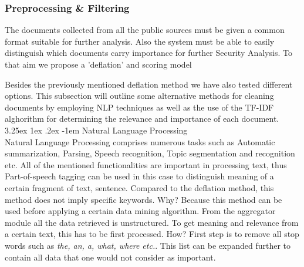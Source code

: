 \documentclass[12pt]{article}
\makeatletter
\newcounter{subsubsubsection}[subsubsection]
\renewcommand\paragraph{\@startsection{paragraph}{5}{\z@}%
  {3.25ex \@plus1ex \@minus.2ex}%
  {-1em}%
  {\normalfont\normalsize\bfseries}}
\makeatother
\begin{document}
\newpage
\subsubsection{Preprocessing \& Filtering}
The documents collected from all the public sources must be given a common format suitable for further analysis. Also the system must be able to easily distinguish which documents carry importance for further Security Analysis. To that aim we propose a 'deflation' and scoring model 


Besides the previously mentioned deflation method we have also tested different options. This subsection will outline some alternative methods for cleaning documents by employing NLP techniques as well as the use of the TF-IDF alghorithm for determining the relevance and importance of each document.
\paragraph{Natural Language Processing}
\hfill \break
\\
Natural Language Processing comprises numerous tasks such as Automatic summarization, Parsing, Speech recognition, Topic segmentation and recognition etc. All of the mentioned functionalities are important in processing text, thus 
Part-of-speech tagging can be used in this case to distinguish meaning of a certain fragment of text, sentence. Compared to the deflation method, this method does not imply specific keywords. Why? Because this method can be used before applying a certain data mining algorithm. From the aggregator module all the data retrieved is unstructured. To get meaning and relevance from a certain text, this has to be first processed. How? First step is to remove all stop words such as \textit{the, an, a, what, where etc.}. This list can be expanded further to contain all data that one would not consider as important.
\end{document}
